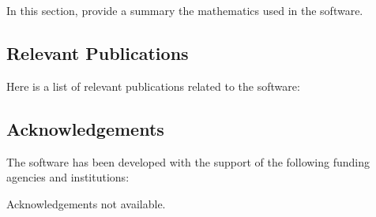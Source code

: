 In this section, provide a summary the mathematics used in the software.


\subsection{Relevant Publications}
\label{sec:Feel++:publications}

Here is a list of relevant publications related to the software:


\subsection{Acknowledgements}
\label{sec::Feel++:acknowledgements}

The software has been developed with the support of the following funding agencies and institutions: 




Acknowledgements not available.


